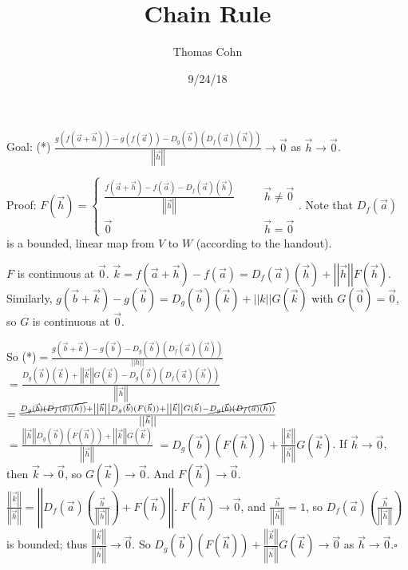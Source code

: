 \documentclass[10pt,letterpaper]{article}
\author{Thomas Cohn}
\title{Chain Rule}
\date{9/24/18} %
\newcommand{\n}{\hfill\break}
\newcommand{\proven}{\;$\square$\n}
\newcommand{\abs}[1]{\left|#1\right|}
\newcommand{\norm}[1]{\abs{\abs{#1}}}
\begin{document}
\maketitle
\setlength\RaggedRightParindent{\parindent}
\RaggedRight

\par\noindent Goal: (*) $\frac{g(f(\vec{a}+\vec{h}))-g(f(\vec{a}))-D_{g}(\vec{b})(D_{f}(\vec{a})(\vec{h}))}{\norm{\vec{h}}}\to\vec{0}$ as $\vec{h}\to\vec{0}$.\n

\par\noindent Proof: $F(\vec{h})=\left\{\begin{array}{lll}\frac{f(\vec{a}+\vec{h})-f(\vec{a})-D_{f}(\vec{a})(\vec{h})}{\norm{\vec{h}}} & \quad & \vec{h}\ne\vec{0}\\ \vec{0} & \quad & \vec{h}=\vec{0}\end{array}\right.$.\n
Note that $D_{f}(\vec{a})$ is a bounded, linear map from $V$ to $W$ (according to the handout).\n

\par\noindent $F$ is continuous at $\vec{0}$.\n
$\vec{k}=f(\vec{a}+\vec{h})-f(\vec{a})=D_{f}(\vec{a})(\vec{h})+\norm{\vec{h}}F(\vec{h})$.\n
Similarly, $g(\vec{b}+\vec{k})-g(\vec{b})=D_{g}(\vec{b})(\vec{k})+\norm{k}G(\vec{k})$ with $G(\vec{0})=\vec{0}$, so $G$ is continuous at $\vec{0}$.\n

\par\noindent So (*)$=\frac{g(\vec{b}+\vec{k})-g(\vec{b})-D_{g}(\vec{b})(D_{f}(\vec{a})(\vec{h}))}{\norm{h}}$\n
\phantom{So (*)}$=\frac{D_{g}(\vec{b})(\vec{k})+\norm{\vec{k}}G(\vec{k})-D_{g}(\vec{b})(D_{f}(\vec{a})(\vec{h}))}{\norm{\vec{h}}}$\n
\phantom{So (*)}$=\frac{\cancel{D_{g}(\vec{b})(D_{f}(\vec{a})(\vec{h}))}+\norm{\vec{h}}D_{g}(\vec{b})(F(\vec{h}))+\norm{\vec{k}}G(\vec{k})-\cancel{D_{g}(\vec{b})(D_{f}(\vec{a})(\vec{h}))}}{\norm{\vec{h}}}$\n
\phantom{So (*)}$=\frac{\norm{\vec{h}}D_{g}(\vec{b})(F(\vec{h}))+\norm{\vec{k}}G(\vec{k})}{\norm{\vec{h}}}$\n
\phantom{So (*)}$=D_{g}(\vec{b})(F(\vec{h}))+\frac{\norm{\vec{k}}}{\norm{\vec{h}}}G(\vec{k})$.\n
If $\vec{h}\to{}\vec{0}$, then $\vec{k}\to\vec{0}$, so $G(\vec{k})\to\vec{0}$. And $F(\vec{h})\to\vec{0}$.\n
$\frac{\norm{\vec{k}}}{\norm{\vec{h}}}=\norm{D_{f}(\vec{a})\left(\frac{\vec{h}}{\norm{\vec{h}}}\right)+F(\vec{h})}$. $F(\vec{h})\to\vec{0}$, and $\frac{\vec{h}}{\norm{\vec{h}}}=1$, so $D_{f}(\vec{a})\left(\frac{\vec{h}}{\norm{\vec{h}}}\right)$ is bounded; thus $\frac{\norm{\vec{k}}}{\norm{\vec{h}}}\to\vec{0}$.\n
So $D_{g}(\vec{b})(F(\vec{h}))+\frac{\norm{\vec{k}}}{\norm{\vec{h}}}G(\vec{k})\to\vec{0}$ as $\vec{h}\to\vec{0}$.\proven
\end{document}
